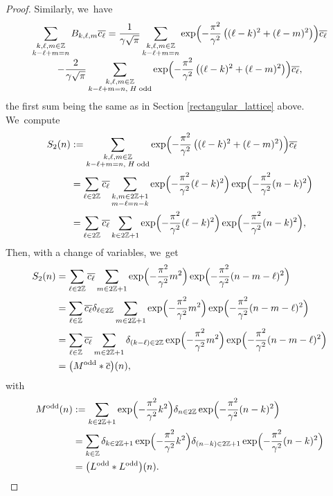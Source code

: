 \documentclass[JEP,XML,SOM,Unicode,NoFloatCountersInSection,published]{cedram}
\theoremstyle{definition}
\let\EE\exp
\let\ov\overline
\newcommand\Z{\mathbb Z}
\newcommand{\pa}[1]{\left(#1\right)}
\begin{document}
\begin{proof}
Similarly, we~have\vspace*{-5pt}
\begin{multline*}
\sum_{\substack {k, \ell, m \in \Z\\ k-\ell+m=n}}B_{k,\ell,m}\ov{c_{\ell}}
= \frac{1}{\gamma\sqrt{\pi}}\sum_{\substack { k, \ell, m \in \Z \\ k-\ell+m=n }}\EE\Bigl({-\frac{\pi^2}{\gamma^2}\pa{(\ell-k)^2+(\ell-m)^2}}\Bigr)\ov{c_{\ell}} \\[-3pt]
- \frac{2}{\gamma\sqrt{\pi}}\sum_{\substack { k, \ell, m \in \Z \\ k-\ell+m=n, \;H\; \text{odd}}}\EE\Bigl({-\frac{\pi^2}{\gamma^2}\pa{(\ell-k)^2+(\ell-m)^2}}\Bigr)\ov{c_{\ell}},
\end{multline*}
the first sum being the same as in Section \ref{rectangular_lattice} above. We~compute
\begin{align*}
S_2(n) &:= \sum_{\substack {k, \ell, m \in \Z \\ k-\ell+m=n, \; H\; \text{odd}}}\EE\Bigl({-\frac{\pi^2}{\gamma^2}\pa{(\ell-k)^2+(\ell-m)^2}}\Bigr)\ov{c_{\ell}} \\
&= \sum_{\ell\in 2\Z}\ov{c_{\ell}} \sum_{\substack {k, m \in 2\Z+1 \\ m-\ell = n-k}}\EE\Bigl({-\frac{\pi^2}{\gamma^2}(\ell-k)^2}\Bigr) \EE\Bigl({-\frac{\pi^2}{\gamma^2}(n-k)^2}\Bigr) \\
&= \sum_{\ell\in 2\Z}\ov{c_{\ell}} \sum_{k \in 2\Z+1}\EE\Bigl({-\frac{\pi^2}{\gamma^2}(\ell-k)^2}\Bigr) \EE\Bigl({-\frac{\pi^2}{\gamma^2}(n-k)^2} \Bigr),
\end{align*}
Then, with a change of variables, we~get
\begin{align*}
S_2 (n)&= \sum_{\ell\in 2\Z}\ov{c_{\ell}} \sum_{m \in 2\Z+1}\EE\Bigl({-\frac{\pi^2}{\gamma^2}m^2}\Bigr) \EE\Bigl({-\frac{\pi^2}{\gamma^2}(n-m-\ell)^2}\Bigr) \\
&= \sum_{\ell\in \Z}\ov{c_{\ell}}\delta_{\ell\in2\Z} \sum_{m \in 2\Z+1}\EE\Bigl({-\frac{\pi^2}{\gamma^2}m^2}\Bigr) \EE\Bigl({-\frac{\pi^2}{\gamma^2}(n-m-\ell)^2} \Bigr)\\
&= \sum_{\ell\in \Z}\ov{c_{\ell}} \sum_{m \in 2\Z+1}\delta_{(k-\ell)\in2\Z}\EE\Bigl({-\frac{\pi^2}{\gamma^2}m^2}\Bigr) \EE\Bigl({-\frac{\pi^2}{\gamma^2}(n-m-\ell)^2} \Bigr)\\
&=\bigl(M^{\text{odd}} * \ov{c}\bigr)(n),
\end{align*}
with
\begin{align}\label{defModd}
M^{\text{odd}}(n) &:=\sum_{k \in 2\Z+1} \EE\Bigl(-\frac{\pi^2}{\gamma^2}k^2\Bigr) \delta_{n\in2\Z}\EE\Bigl(-\frac{\pi^2}{\gamma^2}(n-k)^2\Bigr) \nonumber \\
&= \sum_{k \in \Z} \delta_{k\in2\Z+1}\EE\Bigl(-\frac{\pi^2}{\gamma^2}k^2\Bigr) \delta_{(n-k)\in2\Z+1}\EE\Bigl(-\frac{\pi^2}{\gamma^2}(n-k)^2\Bigr) \nonumber \\
&= \bigl(L^{\text{odd}} * L^{\text{odd}}\bigr) (n).
\end{align}


\end{proof}
\end{document}
